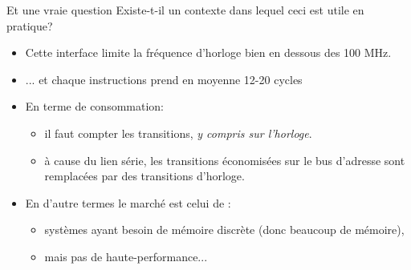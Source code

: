 \documentclass[slidetop,11pt,table]{beamer}
\begin{document}
\begin{frame}{Et une vraie question}
  Existe-t-il un contexte dans lequel ceci est utile en pratique?
  \begin{itemize}
  \item Cette interface limite la fréquence d'horloge bien en dessous des 100 MHz.
  \item ... et chaque instructions prend en moyenne 12-20 cycles
  \item En terme de consommation:
    \begin{itemize}
    \item il faut compter les transitions, \emph{y compris sur
        l'horloge}.
      
    \item à cause du lien série, les transitions économisées sur le bus d'adresse sont remplacées par  des transitions d'horloge. 
    \end{itemize}
    
  \item En d'autre termes le marché est celui de :
    \begin{itemize}
    \item systèmes ayant besoin de mémoire discrète (donc beaucoup de mémoire),  
    \item mais pas de haute-performance...
    \end{itemize}

  \end{itemize}
\end{frame}

\begin{frame}
\end{frame}
\end{document}
